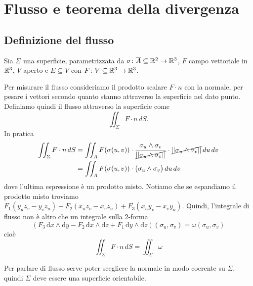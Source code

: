 \documentclass[a4paper]{article}
\begin{document}
\section{Flusso e teorema della divergenza}

\subsection{Definizione del flusso}

\begin{radioactive}
Sia \(\Sigma\) una superficie, parametrizzata da \(\sigma \colon \overline A \subseteq \mathbb{R}^2 \to \mathbb{R}^3\),
\(F\) campo vettoriale in \(\mathbb{R}^3\), \(V\) aperto e \(E \subseteq V\)
con \(F \colon V \subseteq \mathbb{R}^3 \to \mathbb{R}^3\).
\end{radioactive}

\begin{radioactive}
Per misurare il flusso consideriamo il prodotto scalare \(F \cdot n\) con la normale,
per pesare i vettori secondo quanto stanno attraverso la superficie nel dato punto.
Definiamo quindi il flusso attraverso la superficie come
\[
    \iint_\Sigma F \cdot n \,dS.
\]
In pratica
\begin{align*}
    \iint_\Sigma F \cdot n \,dS
    &= \iint_A F(\sigma(u,v)) \cdot \frac{\sigma_u \wedge \sigma_v}{
        \cancel{||\sigma_u \wedge \sigma_v||}
    } \cdot \cancel{||\sigma_u \wedge \sigma_v||}\,du\,dv \\
    &= \iint_A F(\sigma(u,v)) \cdot \bigl(\sigma_u \wedge \sigma_v\bigr) \,du\,dv
\end{align*}
dove l'ultima espressione è un prodotto misto.
Notiamo che se espandiamo il prodotto misto troviamo
\(F_1(y_uz_v - y_vz_u) - F_2(x_uz_v - x_vz_u) + F_3(x_uy_v - x_vy_u)\).
Quindi, l'integrale di flusso non è altro che un integrale sulla \(2\)-forma \[
    \left(
        F_3 \,\mathrm dx \wedge \mathrm dy - F_2 \,\mathrm dx \wedge \mathrm dz
        + F_1 \,\mathrm dy \wedge \mathrm dz
    \right)(\sigma_u, \sigma_v) = \omega(\sigma_u, \sigma_v)
\]
cioè \[
    \iint_\Sigma F\cdot n\,dS = \iint_\Sigma \omega
\]
\end{radioactive}

\begin{radioactive}
Per parlare di flusso serve poter scegliere la normale in modo coerente su \(\Sigma\),
quindi \(\Sigma\) deve essere una superficie orientabile.
\end{radioactive}
\end{document}
